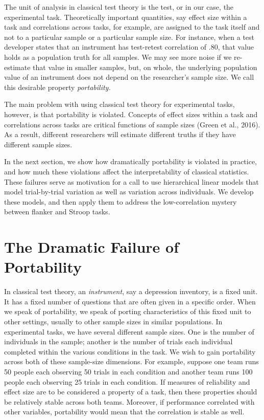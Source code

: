 \documentclass[english,man]{apa6}
\theoremstyle{definition}
\theoremstyle{definition}
\theoremstyle{definition}
\theoremstyle{remark}
\begin{document}
The unit of analysis in classical test theory is the test, or in our
case, the experimental task. Theoretically important quantities, say
effect size within a task and correlations across tasks, for example,
are assigned to the task itself and not to a particular sample or a
particular sample size. For instance, when a test developer states that
an instrument has test-retest correlation of .80, that value holds as a
population truth for all samples. We may see more noise if we
re-estimate that value in smaller samples, but, on whole, the underlying
population value of an instrument does not depend on the researcher's
sample size. We call this desirable property \emph{portability.}

The main problem with using classical test theory for experimental
tasks, however, is that portability is violated. Concepts of effect
sizes within a task and correlations across tasks are critical functions
of sample sizes (Green et al., 2016). As a result, different researchers
will estimate different truths if they have different sample sizes.

In the next section, we show how dramatically portability is violated in
practice, and how much these violations affect the interpretability of
classical statistics. These failures serve as motivation for a call to
use hierarchical linear models that model trial-by-trial variation as
well as variation across individuals. We develop these models, and then
apply them to address the low-correlation mystery between flanker and
Stroop tasks.

\section{The Dramatic Failure of
Portability}\label{the-dramatic-failure-of-portability}

In classical test theory, an \emph{instrument}, say a depression
inventory, is a fixed unit. It has a fixed number of questions that are
often given in a specific order. When we speak of portability, we speak
of porting characteristics of this fixed unit to other settings, usually
to other sample sizes in similar populations. In experimental tasks, we
have several different sample sizes. One is the number of individuals in
the sample; another is the number of trials each individual completed
within the various conditions in the task. We wish to gain portability
across both of these sample-size dimensions. For example, suppose one
team runs 50 people each observing 50 trials in each condition and
another team runs 100 people each observing 25 trials in each condition.
If measures of reliability and effect size are to be considered a
property of a task, then these properties should be relatively stable
across both teams. Moreover, if performance correlated with other
variables, portability would mean that the correlation is stable as
well.
\end{document}
